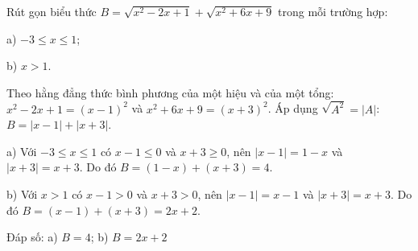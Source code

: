 \begin{problem}[9DS-CAN-041]
Rút gọn biểu thức $B = \sqrt{x^2 - 2x + 1} + \sqrt{x^2 + 6x + 9}$ trong mỗi trường hợp:

a) $-3 \leq x \leq 1$;

b) $x > 1$.

\begin{solution}
Theo hằng đẳng thức bình phương của một hiệu và của một tổng: $x^2 - 2x + 1 = (x - 1)^2$ và $x^2 + 6x + 9 = (x + 3)^2$. Áp dụng $\sqrt{A^2} = |A|$: $B = |x - 1| + |x + 3|$.

a) Với $-3 \leq x \leq 1$ có $x - 1 \leq 0$ và $x + 3 \geq 0$, nên $|x - 1| = 1 - x$ và $|x + 3| = x + 3$. Do đó $B = (1 - x) + (x + 3) = 4$.

b) Với $x > 1$ có $x - 1 > 0$ và $x + 3 > 0$, nên $|x - 1| = x - 1$ và $|x + 3| = x + 3$. Do đó $B = (x - 1) + (x + 3) = 2x + 2$.

Đáp số: a) $\boxed{B = 4}$; b) $\boxed{B = 2x + 2}$
\end{solution}
\end{problem}

